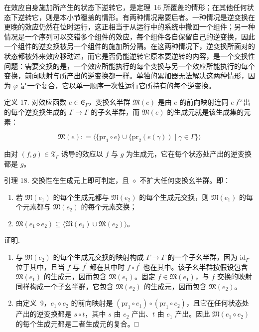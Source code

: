 \documentclass[
  10
]{article}
\begin{document}
在效应自身施加所产生的状态下逆转它，是定理~16 所覆盖的情形；在其他任何状态下逆转它，则是本小节覆盖的情形。有两种情况需要后者。一种情况是逆变换在更晚的效应仍然在位时运行，这正相当于从运行中的系统中撤回一个组件；另一种情况是一个序列可以交错多个组件的效应，每个组件各自保留自己的逆变换，因此一个组件的逆变换被另一个组件的施加所分隔。在这两种情况下，逆变换所面对的状态都被外来效应移动过，而它是否仍能逆转它原本要逆转的内容，是一个交换性问题：需要交换的是，一个效应所能执行的每个变换与另一个效应所能执行的每个变换，前向映射与所产出的逆变换都一样。单独的累加器无法解决这两种情形，因为 \(\varphi\) 是一个复合，它以单一顺序一次性运行它所持有的每个逆变换。

定义 17. 对效应函数 \(e \in \mathfrak { E } _ { \Gamma }\)，变换幺半群
\(\mathfrak { M } ( e )\) 是由 \(e\) 的前向映射连同 \(e\) 产出的每个逆变换生成的
\(\Gamma \to \Gamma\) 的子幺半群，而 \(\mathfrak { M } ( e )\) 的生成元就是该生成集的元素：

\[
\mathfrak { M } ( e ) : = \langle \{ \mathrm { p r } _ { 1 } \circ e \} \cup \{ \mathrm { p r } _ { 2 } ( e ( \gamma ) ) \mid \gamma \in \Gamma \} \rangle\tag{17}
\]

由对 \(( f , g ) \in \mathfrak { T } _ { \Gamma }\) 诱导的效应以 \(f\) 与 \(g\) 为生成元，它在每个状态处产出的逆变换都是 \(g\)。

引理 18. 交换性在生成元上即可判定，且 $\diamond$ 不扩大任何变换幺半群。即：

\begin{enumerate}
\def\labelenumi{\arabic{enumi}.}
\item
  若 \(\mathfrak { M } ( e _ { 1 } )\) 的每个生成元都与 \(\mathfrak { M } ( e _ { 2 } )\) 的每个生成元交换，则
  \(\mathfrak { M } ( e _ { 1 } )\) 的每个元素都与 \(\mathfrak { M } ( e _ { 2 } )\) 的每个元素交换；
\item
  \(\mathfrak { M } ( e _ { 1 } \diamond e _ { 2 } ) \subseteq \langle \mathfrak { M } ( e _ { 1 } ) \cup \mathfrak { M } ( e _ { 2 } ) \rangle\)。
\end{enumerate}

证明.

\begin{enumerate}
\def\labelenumi{\arabic{enumi}.}
\item
  与 \(\mathfrak { M } ( e _ { 2 } )\) 的每个生成元交换的映射构成 \(\Gamma \to \Gamma\) 的一个子幺半群，因为
  \(\mathrm { i d } _ { \Gamma }\) 位于其中，且当 \(f\) 与 \(f ^ { \prime }\) 都在其中时
  \(f \circ f ^ { \prime }\) 也在其中。该子幺半群按假设包含 \(\mathfrak { M } ( e _ { 1 } )\) 的生成元，因而包含
  \(\mathfrak { M } ( e _ { 1 } )\)。固定 \(f \in \mathfrak { M } ( e _ { 1 } )\)，与 \(f\) 交换的映射同样构成一个子幺半群，它包含 \(\mathfrak { M } ( e _ { 2 } )\) 的生成元，因而包含
  \(\mathfrak { M } ( e _ { 2 } )\)。
\item
  由定义~9，\(e _ { 1 } \diamond e _ { 2 }\) 的前向映射是
  \(\left( \mathrm { p r } _ { 1 } \circ e _ { 1 } \right) \circ \left( \mathrm { p r } _ { 1 } \circ e _ { 2 } \right)\)，且它在任何状态处产出的逆变换都是 \(s \circ t\)，其中 \(s\) 由 \(e _ { 2 }\) 产出、\(t\) 由 \(e _ { 1 }\) 产出。因此
  \(\mathfrak { M } ( e _ { 1 } \diamond e _ { 2 } )\) 的每个生成元都是二者生成元的复合。□
\end{enumerate}
\end{document}

